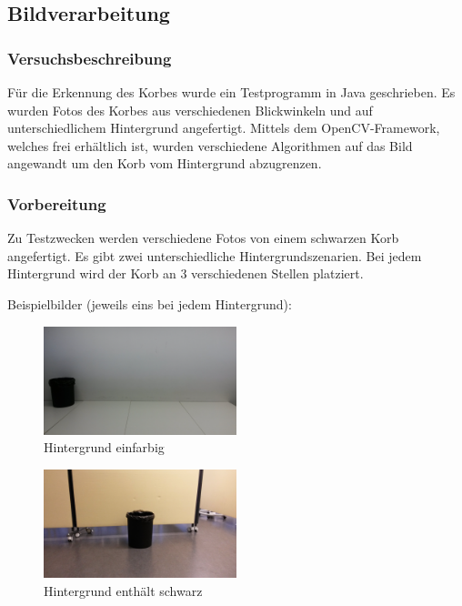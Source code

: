 \subsection{Bildverarbeitung}

\subsubsection{Versuchsbeschreibung}
Für die Erkennung des Korbes wurde ein Testprogramm in Java geschrieben. Es wurden Fotos des Korbes aus verschiedenen Blickwinkeln und auf unterschiedlichem Hintergrund angefertigt. Mittels dem OpenCV-Framework, welches frei erhältlich ist, wurden verschiedene Algorithmen auf das Bild angewandt um den Korb vom Hintergrund abzugrenzen.

\subsubsection{Vorbereitung}
Zu Testzwecken werden verschiedene Fotos von einem schwarzen Korb angefertigt. 
Es gibt zwei unterschiedliche Hintergrundszenarien. Bei jedem Hintergrund wird der 
Korb an 3 verschiedenen Stellen platziert.

Beispielbilder (jeweils eins bei jedem Hintergrund):

\begin{figure}[h!]
    \centering
    \includegraphics[width=0.5\textwidth]{fig/korb4.jpg}
    \caption{Hintergrund einfarbig}
    \label{fig:Korb_HEinfarbig}
\end{figure}

\begin{figure}[h!]
    \centering
    \includegraphics[width=0.5\textwidth]{fig/korb1.jpg}
    \caption{Hintergrund enthält schwarz}
    \label{fig:Korb_HSchwarz}
\end{figure}

